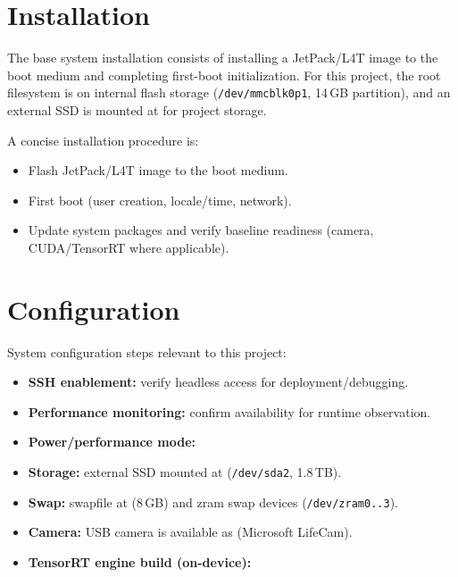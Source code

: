 \section{Installation}
\noindent
The base system installation consists of installing a JetPack/L4T image to the boot medium and completing first-boot initialization.
For this project, the root filesystem is on internal flash storage (\texttt{/dev/mmcblk0p1}, 14\,GB partition), and an external SSD is mounted at  for project storage.

\vspace{1mm}
\noindent
A concise installation procedure is:
\begin{itemize}
	\item Flash JetPack/L4T image to the boot medium.
	\item First boot (user creation, locale/time, network).
	\item Update system packages and verify baseline readiness (camera, CUDA/TensorRT where applicable).
\end{itemize}

\section{Configuration}
\noindent
System configuration steps relevant to this project:
\begin{itemize}
	\item \textbf{SSH enablement:} verify headless access for deployment/debugging.
	\item \textbf{Performance monitoring:} confirm  availability for runtime observation.
	\item \textbf{Power/performance mode:} 
	\item \textbf{Storage:} external SSD mounted at  (\texttt{/dev/sda2}, 1.8\,TB).
	\item \textbf{Swap:} swapfile at  (8\,GB) and zram swap devices (\texttt{/dev/zram0..3}).
	\item \textbf{Camera:} USB camera is available as  (Microsoft LifeCam).
	\item \textbf{TensorRT engine build (on-device):} 
	\end{itemize}

